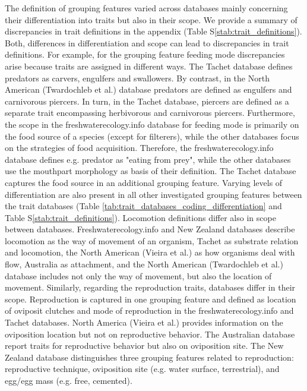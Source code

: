 \documentclass[../Draft_harmonization_paper.tex]{subfiles}
\begin{document}
The definition of grouping features varied across databases mainly concerning their differentiation into traits but also in their scope. We provide a summary of discrepancies in trait definitions in the appendix (Table S\ref{stab:trait_definitions}). Both, differences in differentiation and scope can lead to discrepancies in trait definitions. For example, for the grouping feature feeding mode discrepancies arise because traits are assigned in different ways. The Tachet database defines predators as carvers, engulfers and swallowers. By contrast, in the North American (Twardochleb et al.) database predators are defined as engulfers and carnivorous piercers. In turn, in the Tachet database, piercers are defined as a separate trait encompassing herbivorous and carnivorous piercers. Furthermore, the scope in the freshwaterecology.info database for feeding mode is primarily on the food source of a species (except for filterers), while the other databases focus on the strategies of food acquisition. Therefore, the freshwaterecology.info database defines e.g. predator as "eating from prey", while the other databases use the mouthpart morphology as basis of their definition. The Tachet database captures the food source in an additional grouping feature. Varying levels of differentiation are also present in all other investigated grouping features between the trait databases (Table \ref{tab:trait_databases_coding_differentiation} and Table S\ref{stab:trait_definitions}). Locomotion definitions differ also in scope between databases. Freshwaterecology.info and New Zealand databases describe locomotion as the way of movement of an organism, Tachet as substrate relation and locomotion, the North American (Vieira et al.) as how organisms deal with flow, Australia as attachment, and the North American (Twardochleb et al.) database includes not only the way of movement, but also the location of movement. Similarly, regarding the reproduction traits, databases differ in their scope. Reproduction is captured in one grouping feature and defined as location of oviposit clutches and mode of reproduction in the freshwaterecology.info and Tachet databases. North America (Vieira et al.) provides information on the oviposition location but not on reproductive behavior. The Australian database report traits for reproductive behavior but also on oviposition site. The New Zealand database distinguishes three grouping features related to reproduction: reproductive technique, oviposition site (e.g. water surface, terrestrial), and egg/egg mass (e.g. free, cemented).
\end{document}
